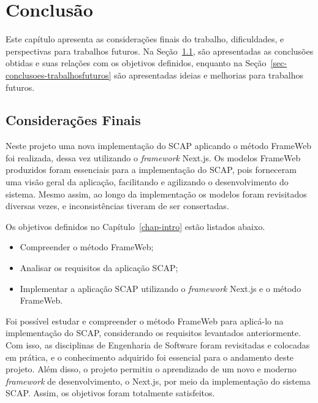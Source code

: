\chapter{Conclusão}
\label{chap-conclusao}


Este capítulo apresenta as considerações finais do trabalho, dificuldades, e perspectivas para trabalhos futuros.
Na Seção~\ref{sec-conclusoes-consideracoes}, são apresentadas as conclusões obtidas e suas relações com os objetivos definidos, enquanto
na Seção~\ref{sec-conclusoes-trabalhosfuturos} são apresentadas ideias e melhorias para trabalhos futuros.

\section{Considerações Finais}
\label{sec-conclusoes-consideracoes}

Neste projeto uma nova implementação do SCAP aplicando o método FrameWeb foi realizada, dessa vez utilizando o \textit{framework} Next.js.
Os modelos FrameWeb produzidos foram essenciais para a implementação do SCAP, pois forneceram uma visão geral da aplicação, facilitando e agilizando o desenvolvimento do sistema.
Mesmo assim, ao longo da implementação os modelos foram revisitados diversas vezes, e inconsistências tiveram de ser consertadas.

Os objetivos definidos no Capítulo~\ref{chap-intro} estão listados abaixo.
\begin{itemize}
    \item Compreender o método FrameWeb;
    \item Analisar os requisitos da aplicação SCAP;
    \item Implementar a aplicação SCAP utilizando o \textit{framework} Next.js e o método FrameWeb.
\end{itemize}

Foi possível estudar e compreender o método FrameWeb para aplicá-lo na implementação do SCAP, considerando os requisitos levantados anteriormente.
Com isso, as disciplinas de Engenharia de Software foram revisitadas e colocadas em prática, e o conhecimento adquirido foi essencial para o andamento deste projeto.
Além disso, o projeto permitiu o aprendizado de um novo e moderno \textit{framework} de desenvolvimento, o Next.js, por meio da implementação do sistema SCAP.
Assim, os objetivos foram totalmente satisfeitos.



